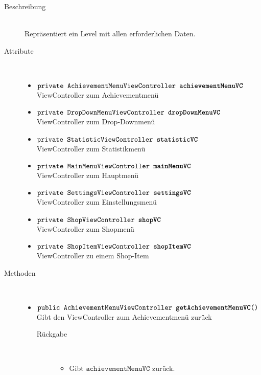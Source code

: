 \begin{description}
\item[Beschreibung] \hfill \\ Repräsentiert ein Level mit allen erforderlichen Daten.

\item[Attribute] \hfill \\
	\vspace{-.8cm}
	\begin{itemize}
		\item $\texttt{private AchievementMenuViewController \textbf{achievementMenuVC}}$ \\ ViewController zum Achievementmenü
		\item $\texttt{private DropDownMenuViewController \textbf{dropDownMenuVC}}$ \\ ViewController zum Drop-Downmenü
		\item $\texttt{private StatisticViewController \textbf{statisticVC}}$ \\ ViewController zum Statistikmenü
		\item $\texttt{private MainMenuViewController \textbf{mainMenuVC}}$ \\ ViewController zum Hauptmenü
		\item $\texttt{private SettingsViewController \textbf{settingsVC}}$ \\ ViewController zum Einstellungsmenü
		\item $\texttt{private ShopViewController \textbf{shopVC}}$ \\ ViewController zum Shopmenü
		\item $\texttt{private ShopItemViewController \textbf{shopItemVC}}$ \\ ViewController zu einem Shop-Item
		
		\end{itemize}
	
	
\item[Methoden] \hfill \\
	\vspace{-.8cm}
	\begin{itemize}
		\item $\texttt{public AchievementMenuViewController \textbf{getAchievementMenuVC}()}$ \\ Gibt den ViewController zum Achievementmenü zurück
		\begin{description}
			\item[Rückgabe] \hfill \\
			\vspace{-.8cm}
			\begin{itemize}
				\item Gibt $\texttt{achievementMenuVC}$ zurück.
			\end{itemize}
			\end{description}
		

\end{itemize}
\end{description}
